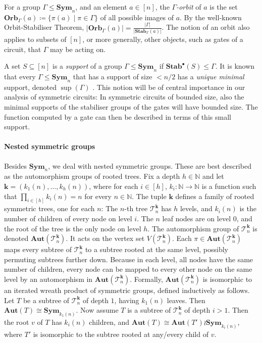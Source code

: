 \documentclass[11pt]{article}
\DeclareMathOperator{\supp}{sup}
\newcommand{\Aut}{\mathbf{Aut}}
\newcommand{\Sym}{\mathbf{Sym}}
\newcommand{\Stab}{\mathbf{Stab}}
\newcommand{\StabP}{\mathbf{Stab}^{\bullet}}
\newcommand{\Orb}{\mathbf{Orb}}
\newcommand{\bbN}{\mathbb{N}}
\newcommand{\Tt}{{\mathcal T}}
\theoremstyle{definition}
\theoremstyle{plain}
\theoremstyle{remark}
\theoremstyle{remark}
\begin{document}
For a group $\Gamma \leq \Sym_n$, and an element $a \in [n]$, the \emph{$\Gamma$-orbit} of $a$ is the set $\Orb_\Gamma(a) \coloneqq \{ \pi(a) \mid \pi \in \Gamma  \}$ of all possible images of $a$.
By the well-known Orbit-Stabiliser Theorem, $|\Orb_\Gamma(a)| = \frac{|\Gamma|}{|\Stab_\Gamma(a)|}$.
The notion of an orbit also applies to subsets of $[n]$, or more generally, other objects, such as gates of a circuit, that $\Gamma$ may be acting on.  

A set $S \subseteq [n]$ is a \emph{support} of a group $\Gamma \leq \Sym_n$ if $\StabP(S) \leq \Gamma$. It is known that every $\Gamma \leq \Sym_n$ that has a support of size $< n/2$ has a \emph{unique minimal} support, denoted $\supp(\Gamma)$ \cite[Lemma 26]{blass1999choiceless}.
This notion will be of central importance in our analysis of symmetric circuits:
In symmetric circuits of bounded size, also the minimal supports of the stabiliser groups of the gates will have bounded size. The function computed by a gate can then be described in terms of this small support.

\paragraph*{Nested symmetric groups}
Besides $\Sym_n$, we deal with nested symmetric groups. These are best described as the automorphism groups of rooted trees. 
Fix a depth $h \in \bbN$ and let $\boldsymbol{k} = (k_1(n), \dots, k_h(n))$, where for each $i \in [h]$, $k_i \colon \bbN \to \bbN$ is a function such that $\prod_{i \in [h]} k_i(n) = n$ for every $n \in \bbN$. The tuple $\boldsymbol{k}$ defines a family of rooted symmetric trees, one for each $n$: The $n$-th tree $\Tt_n^{\boldsymbol{k}}$ has $h$ levels, and $k_i(n)$ is the number of children of every node on level $i$. 
The $n$ leaf nodes are on level $0$, and the root of the tree is the only node on level $h$. The automorphism group of $\Tt_n^{\boldsymbol{k}}$ is denoted $\Aut(\Tt_n^{\boldsymbol{k}})$. It acts on the vertex set $V(\Tt_n^{\boldsymbol{k}})$. Each $\pi \in \Aut(\Tt_n^{\boldsymbol{k}})$ maps every subtree of $\Tt_n^{\boldsymbol{k}}$ to a subtree rooted at the same level, possibly permuting subtrees further down. Because in each level, all nodes have the same number of children, every node can be mapped to every other node on the same level by an automorphism in $\Aut(\Tt_n^{\boldsymbol{k}})$.
Formally, $\Aut(\Tt_n^{\boldsymbol{k}})$ is isomorphic to an iterated wreath product of symmetric groups, defined inductively as follows.
Let $T$ be a subtree of $\Tt_n^{\boldsymbol{k}}$ of depth $1$, having $k_1(n)$ leaves. Then $\Aut(T) \cong \Sym_{k_1(n)}$. Now assume $T$ is a subtree of $\Tt_n^{\boldsymbol{k}}$ of depth $i > 1$. Then the root $v$ of $T$ has $k_i(n)$ children, and $\Aut(T) \cong \Aut(T') \wr \Sym_{k_i(n)}$, where $T'$ is isomorphic to the subtree rooted at any/every child of $v$. 
\end{document}
